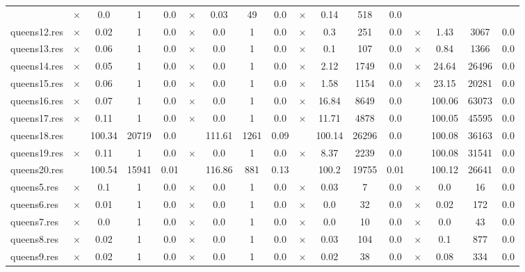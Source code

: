 \documentclass[main.tex]{subfiles}
\begin{document}
\begin{landscape}
\begin{center}
\begin{tabular}{lcccccccccccccccc}
 & $\times$ & 0.0 & 1 & 0.0
 & $\times$ & 0.03 & 49 & 0.0
 & $\times$ & 0.14 & 518 & 0.0
\\
queens12.res & $\times$ & 0.02 & 1 & 0.0
 & $\times$ & 0.0 & 1 & 0.0
 & $\times$ & 0.3 & 251 & 0.0
 & $\times$ & 1.43 & 3067 & 0.0
\\
queens13.res & $\times$ & 0.06 & 1 & 0.0
 & $\times$ & 0.0 & 1 & 0.0
 & $\times$ & 0.1 & 107 & 0.0
 & $\times$ & 0.84 & 1366 & 0.0
\\
queens14.res & $\times$ & 0.05 & 1 & 0.0
 & $\times$ & 0.0 & 1 & 0.0
 & $\times$ & 2.12 & 1749 & 0.0
 & $\times$ & 24.64 & 26496 & 0.0
\\
queens15.res & $\times$ & 0.06 & 1 & 0.0
 & $\times$ & 0.0 & 1 & 0.0
 & $\times$ & 1.58 & 1154 & 0.0
 & $\times$ & 23.15 & 20281 & 0.0
\\
queens16.res & $\times$ & 0.07 & 1 & 0.0
 & $\times$ & 0.0 & 1 & 0.0
 & $\times$ & 16.84 & 8649 & 0.0
 &  & 100.06 & 63073 & 0.0
\\
queens17.res & $\times$ & 0.11 & 1 & 0.0
 & $\times$ & 0.0 & 1 & 0.0
 & $\times$ & 11.71 & 4878 & 0.0
 &  & 100.05 & 45595 & 0.0
\\
queens18.res &  & 100.34 & 20719 & 0.0
 &  & 111.61 & 1261 & 0.09
 &  & 100.14 & 26296 & 0.0
 &  & 100.08 & 36163 & 0.0
\\
queens19.res & $\times$ & 0.11 & 1 & 0.0
 & $\times$ & 0.0 & 1 & 0.0
 & $\times$ & 8.37 & 2239 & 0.0
 &  & 100.08 & 31541 & 0.0
\\
queens20.res &  & 100.54 & 15941 & 0.01
 &  & 116.86 & 881 & 0.13
 &  & 100.2 & 19755 & 0.01
 &  & 100.12 & 26641 & 0.0
\\
queens5.res & $\times$ & 0.1 & 1 & 0.0
 & $\times$ & 0.0 & 1 & 0.0
 & $\times$ & 0.03 & 7 & 0.0
 & $\times$ & 0.0 & 16 & 0.0
\\
queens6.res & $\times$ & 0.01 & 1 & 0.0
 & $\times$ & 0.0 & 1 & 0.0
 & $\times$ & 0.0 & 32 & 0.0
 & $\times$ & 0.02 & 172 & 0.0
\\
queens7.res & $\times$ & 0.0 & 1 & 0.0
 & $\times$ & 0.0 & 1 & 0.0
 & $\times$ & 0.0 & 10 & 0.0
 & $\times$ & 0.0 & 43 & 0.0
\\
queens8.res & $\times$ & 0.02 & 1 & 0.0
 & $\times$ & 0.0 & 1 & 0.0
 & $\times$ & 0.03 & 104 & 0.0
 & $\times$ & 0.1 & 877 & 0.0
\\
queens9.res & $\times$ & 0.02 & 1 & 0.0
 & $\times$ & 0.0 & 1 & 0.0
 & $\times$ & 0.02 & 38 & 0.0
 & $\times$ & 0.08 & 334 & 0.0
\\
\hline\end{tabular}
\end{center}
\end{landscape}
\end{document}
